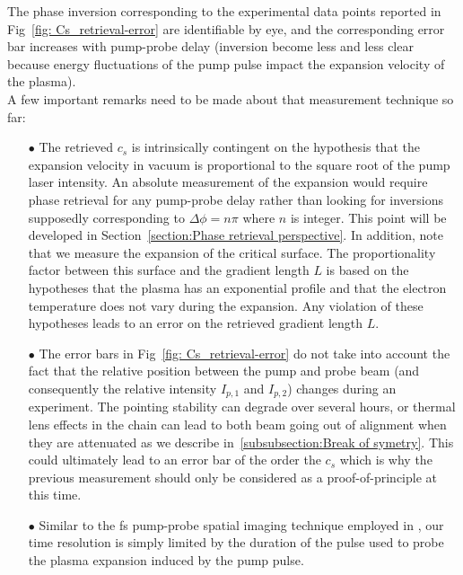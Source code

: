 \noindent The phase inversion corresponding to the experimental data points reported in Fig~\ref{fig: Cs_retrieval-error} are identifiable by eye, and the corresponding error bar increases with pump-probe delay (inversion become less and less clear because energy fluctuations of the pump pulse impact the expansion velocity of the plasma).\\
A few important remarks need to be made about that measurement technique so far:\\

\begin{itemize}
\item[$\bullet$] The retrieved $c_s$ is intrinsically contingent on the hypothesis that the expansion velocity in vacuum is proportional to the square root of the pump laser intensity. An absolute measurement of the expansion would require phase retrieval for any pump-probe delay rather than looking for inversions supposedly corresponding to $\Delta\phi = n\pi$ where $n$ is integer. This point will be developed in Section~\ref{section:Phase retrieval perspective}. In addition, note that we measure the expansion of the critical surface. The proportionality factor between this surface and the gradient length $L$ is based on the hypotheses that the plasma has an exponential profile and that the electron temperature does not vary during the expansion. Any violation of these hypotheses leads to an error on the retrieved gradient length $L$.

\item[$\bullet$] The error bars in Fig~\ref{fig: Cs_retrieval-error} do not take into account the fact that the relative position between the pump and probe beam (and consequently the relative intensity $I_{p,1}$ and $I_{p,2}$) changes during an experiment. The pointing stability can degrade over several hours, or thermal lens effects in the chain can lead to both beam going out of alignment when they are attenuated as we describe in~\ref{subsubsection:Break of symetry}. This could ultimately lead to an error bar of the order the $c_s$ which is why the previous measurement should only be considered as a proof-of-principle at this time. 

\item[$\bullet$] Similar to the fs pump-probe spatial imaging technique employed in \cite{Downer1985}, our time resolution is simply limited by the duration of the pulse used to probe the plasma expansion induced by the pump pulse.

\end{itemize}

